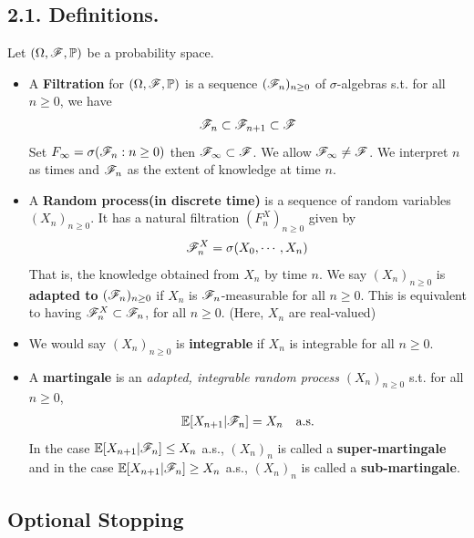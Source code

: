 \documentclass[12pt,a4paper]{report}
\begin{document}
\subsection*{2.1. Definitions.}

Let $(\Omega, \mathscr{F}, \mathbb{P})$ be a probability space.


\begin{itemize}
\item A \textbf{Filtration} for $(\Omega, \mathscr{F}, \mathbb{P})$ is a sequence $(\mathscr{F}_n)_{n\geq 0}$ of $\sigma$-algebras s.t. for all $n \geq 0$, we have
\begin{align*}
\mathscr{F}_n\subset \mathscr{F}_{n+1} \subset \mathscr{F}
\end{align*}
Set $F_{\infty} = \sigma(\mathscr{F}_n:n\geq 0)$ then $\mathscr{F}_{\infty} \subset \mathscr{F}$. We allow $\mathscr{F}_{\infty} \neq \mathscr{F}$. We interpret $n$ as times and $\mathscr{F}_n$ as the extent of knowledge at time $n$.

\item A \textbf{Random process(in discrete time)} is a sequence of random variables $(X_n)_{n\geq 0}$. It has a natural filtration $(F_n^X)_{n\geq 0}$ given by
\begin{align*}
\mathscr{F}_n^X = \sigma(X_0, \cdots, X_n)
\end{align*}
That is, the knowledge obtained from $X_n$ by time $n$. We say $(X_n)_{n\geq 0}$ is \textbf{adapted to} $(\mathscr{F}_n)_{n\geq 0}$ if $X_n$ is $\mathscr{F}_n$-measurable for all $n\geq 0$. This is equivalent to having $\mathscr{F}_n^X \subset \mathscr{F}_n$, for all $n \geq 0$. (Here, $X_n$ are real-valued) 

\item We would say $(X_n)_{n\geq 0}$ is \textbf{integrable} if $X_n$ is integrable for all $n\geq 0$.

\item A \textbf{martingale} is an \emph{adapted, integrable random process} $(X_n)_{n\geq 0}$ s.t. for all $n\geq 0$,
\begin{align*}
\mathbb{E}[X_{n+1} |\mathscr{F}_n] = X_n \quad \text{a.s.}
\end{align*}
In the case $\mathbb{E}[X_{n+1} |\mathscr{F}_n] \leq X_n$ a.s., $(X_n)_n$ is called a \textbf{super-martingale} and in the case $\mathbb{E}[X_{n+1} |\mathscr{F}_n] \geq X_n $ a.s., $(X_n)_n$ is called a \textbf{sub-martingale}.
\end{itemize}

\newcommand{\randp}{(X_n)_{n \geq 0}} %

\subsection*{Optional Stopping}
\end{document}
